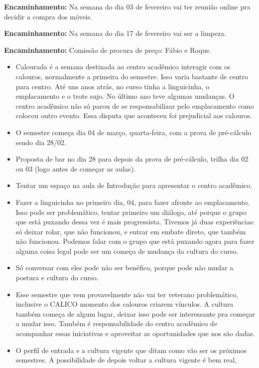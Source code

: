 \documentclass{ata-calico}
\begin{document}
\textbf{Encaminhamento:} Na semana do dia 03 de fevereiro vai ter reunião online pra decidir a compra dos móveis.

\textbf{Encaminhamento:} Na semana do dia 17 de fevereiro vai ser a limpeza.

\textbf{Encaminhamento:} Comissão de procura de preço: Fábio e Roque.

\begin{itemize}
\item Calourada é a semana destinada ao centro acadêmico interagir com os calouros, normalmente a primeira do semestre. Isso varia bastante de centro para centro. Até uns anos atrás, no curso tinha a linguicinha, o emplacamento e o trote sujo. No último ano teve algumas mudanças. O centro acadêmico não só parou de se responsabilizar pelo emplacamento como colocou outro evento. Essa disputa que aconteceu foi prejudicial aos calouros.
\item O semestre começa dia 04 de março, quarta-feira, com a prova de pré-cálculo sendo dia 28/02.
\item Proposta de bar no dia 28 para depois da prova de pré-cálculo, trilha dia 02 ou 03 (logo antes de começar as aulas).
\item Tentar um espaço na aula de Introdução para apresentar o centro acadêmico.
\item Fazer a linguicinha no primeiro dia, 04, para fazer afronte ao emplacamento. Isso pode ser problemático, tentar primeiro um diálogo, até porque o grupo que está puxando dessa vez é mais progressista. Tivemos já duas experiências:
  só deixar rolar, que não funcionou, e entrar em embate direto, que também não
  funcionou. Podemos falar com o grupo que está puxando agora para fazer alguma
  coisa legal pode ser um começo de mudança da cultura do curso.
 \item Só conversar com eles pode não ser benéfico, porque pode não mudar a postura
  e cultura do curso.
\item Esse semestre que vem provavelmente não vai ter veterano problemático, inclusive o
CALICO  momento dos calouros criarem vínculos. A cultura também começa de algum
  lugar, deixar isso pode ser interessante pra começar a mudar isso. Também é
  responsabilidade do centro acadêmico de acompanhar essas iniciativas e
  aproveitar as oportunidades que nos são dadas.
\item O perfil de entrada e a cultura vigente que ditam como vão ser os próximos
  semestres. A possibilidade de depois voltar a cultura vigente é bem real,

\end{itemize}
\end{document}
